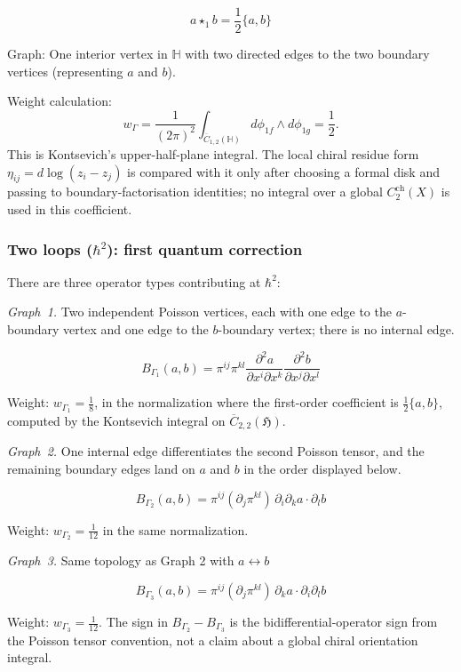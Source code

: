 \[a \star_1 b = \frac{1}{2}\{a, b\}\]

Graph: One interior vertex in $\mathbb{H}$ with two directed edges to the two boundary vertices (representing $a$ and $b$).

Weight calculation:
\[
w_\Gamma
=\frac{1}{(2\pi)^2}
\int_{\overline C_{1,2}(\mathbb H)}
d\phi_{1f}\wedge d\phi_{1g}
=\frac12 .
\]
This is Kontsevich's upper-half-plane integral. The local chiral
residue form \(\eta_{ij}=d\log(z_i-z_j)\) is compared with it only
after choosing a formal disk and passing to boundary-factorisation
identities; no integral over a global
\(C_2^{\mathrm{ch}}(X)\) is used in this coefficient.

\subsubsection{\texorpdfstring{Two loops ($\hbar^2$): first quantum correction}{Two loops (2): first quantum correction}}

There are three operator types contributing at $\hbar^2$:

\emph{Graph~1.} Two independent Poisson vertices, each with one edge
to the \(a\)-boundary vertex and one edge to the \(b\)-boundary
vertex; there is no internal edge.

\[B_{\Gamma_1}(a,b) = \pi^{ij} \pi^{kl} \frac{\partial^2 a}{\partial x^i \partial x^k} \frac{\partial^2 b}{\partial x^j \partial x^l}\]

Weight: \(w_{\Gamma_1}=\frac18\), in the normalization where the
first-order coefficient is \(\frac12\{a,b\}\), computed by the
Kontsevich integral on \(\overline C_{2,2}(\mathfrak H)\).

\emph{Graph~2.} One internal edge differentiates the second Poisson
tensor, and the remaining boundary edges land on \(a\) and \(b\) in
the order displayed below.

\[B_{\Gamma_2}(a,b) = \pi^{ij} (\partial_j\pi^{kl})\, \partial_i\partial_k a \cdot \partial_l b\]

Weight: \(w_{\Gamma_2}=\frac1{12}\) in the same normalization.

\emph{Graph~3.} Same topology as Graph 2 with $a \leftrightarrow b$

\[B_{\Gamma_3}(a,b) = \pi^{ij} (\partial_j\pi^{kl})\, \partial_k a \cdot \partial_i\partial_l b\]

Weight: \(w_{\Gamma_3}=\frac1{12}\). The sign in
\(B_{\Gamma_2}-B_{\Gamma_3}\) is the bidifferential-operator sign
from the Poisson tensor convention, not a claim about a global chiral
orientation integral.

